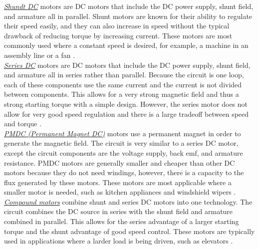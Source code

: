 \noindent \underline{\textit{Shundt DC}} motors are DC motors that include the DC power supply, shunt field, and armature all in parallel. Shunt motors are known for their ability to regulate their speed easily, and they can also increase in speed without the typical drawback of reducing torque by increasing current. These motors are most commonly used where a constant speed is desired, for example, a machine in an assembly line or a fan \cite{elprocus3}. \\

\noindent \underline{\textit{Series DC}} motors are DC motors that include the DC power supply, shunt field, and armature all in series rather than parallel. Because the circuit is one loop, each of these components use the same current and the current is not divided between components. This allows for a very strong magnetic field and thus a strong starting torque with a simple design. However, the series motor does not allow for very good speed regulation and there is a large tradeoff between speed and torque \cite{elprocus4}. \\

\noindent \underline{\textit{PMDC (Permanent Magnet DC)}} motors use a permanent magnet in order to generate the magnetic field. The circuit is very similar to a series DC motor, except the circuit components are the voltage supply, back emf, and armature resistance. PMDC motors are generally smaller and cheaper than other DC motors because they do not need windings, however, there is a capacity to the flux generated by these motors. These motors are most applicable where a smaller motor is needed, such as kitchen appliances and windshield wipers \cite{elprocus5}. \\

\noindent \underline{\textit{Compound motors}} combine shunt and series DC motors into one technology. The circuit combines the DC source in series with the shunt field and armature combined in parallel. This allows for the series advantage of a larger starting torque and the shunt advantage of good speed control. These motors are typically used in applications where a larder load is being driven, such as elevators \cite{linquip}. \\

